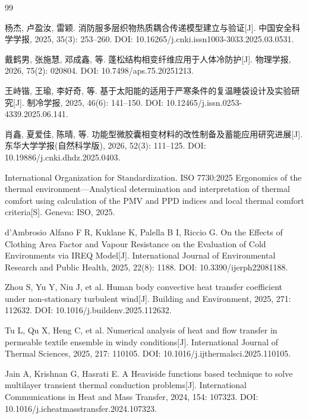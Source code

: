 \begingroup
\footnotesize
\setlength{\parskip}{0pt}
\begin{thebibliography}{99}
\setlength{\itemsep}{0.12ex}
\setlength{\parsep}{0pt}
\setlength{\topsep}{0.2ex}

 杨杰, 卢盈汝, 雷颖. 消防服多层织物热质耦合传递模型建立与验证[J]. 中国安全科学学报, 2025, 35(3): 253--260. DOI: 10.16265/j.cnki.issn1003-3033.2025.03.0531.

 戴鹤男, 张施慧, 邓成鑫, 等. 蓬松结构相变纤维应用于人体冷防护[J]. 物理学报, 2026, 75(2): 020804. DOI: 10.7498/aps.75.20251213.

 王峙锴, 王瑜, 李好奇, 等. 基于太阳能的适用于严寒条件的复温睡袋设计及实验研究[J]. 制冷学报, 2025, 46(6): 141--150. DOI: 10.12465/j.issn.0253-4339.2025.06.141.

 肖鑫, 夏爱佳, 陈晴, 等. 功能型微胶囊相变材料的改性制备及蓄能应用研究进展[J]. 东华大学学报(自然科学版), 2026, 52(3): 111--125. DOI: 10.19886/j.cnki.dhdz.2025.0403.

 International Organization for Standardization. ISO 7730:2025 Ergonomics of the thermal environment---Analytical determination and interpretation of thermal comfort using calculation of the PMV and PPD indices and local thermal comfort criteria[S]. Geneva: ISO, 2025.

 d'Ambrosio Alfano F R, Kuklane K, Palella B I, Riccio G. On the Effects of Clothing Area Factor and Vapour Resistance on the Evaluation of Cold Environments via IREQ Model[J]. International Journal of Environmental Research and Public Health, 2025, 22(8): 1188. DOI: 10.3390/ijerph22081188.

 Zhou S, Yu Y, Niu J, et al. Human body convective heat transfer coefficient under non-stationary turbulent wind[J]. Building and Environment, 2025, 271: 112632. DOI: 10.1016/j.buildenv.2025.112632.

 Tu L, Qu X, Heng C, et al. Numerical analysis of heat and flow transfer in permeable textile ensemble in windy conditions[J]. International Journal of Thermal Sciences, 2025, 217: 110105. DOI: 10.1016/j.ijthermalsci.2025.110105.

 Jain A, Krishnan G, Hasrati E. A Heaviside functions based technique to solve multilayer transient thermal conduction problems[J]. International Communications in Heat and Mass Transfer, 2024, 154: 107323. DOI: 10.1016/j.icheatmasstransfer.2024.107323.


\end{thebibliography}
